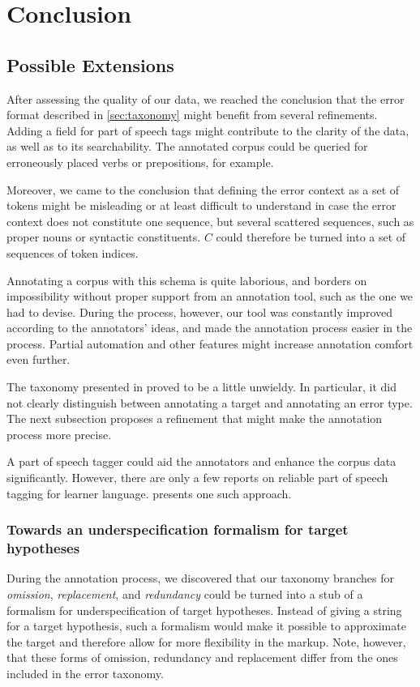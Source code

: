 \documentclass[12pt]{article}
\begin{document}
\section{Conclusion}

\subsection{Possible Extensions}

After assessing the quality of our data, we reached
the conclusion that the error format described in \ref{sec:taxonomy}
might benefit from several refinements. Adding a field for part of speech tags
might contribute to the clarity of the data, as well as to its searchability.
The annotated corpus could be queried for erroneously placed verbs or
prepositions, for example.

Moreover, we came to the conclusion that defining the error context as a set of
tokens might be misleading or at least difficult to understand in case the error
context does not constitute one sequence, but several scattered sequences, such
as proper nouns or syntactic constituents. $C$ could therefore be turned into a
set of sequences of token indices.

Annotating a corpus with this schema is quite laborious, and borders on
impossibility without proper support from an annotation tool, such as the one we
had to devise. During the process, however, our tool was constantly improved
according to the annotators' ideas, and made the annotation process easier in
the process. Partial automation and other features might increase annotation
comfort even further.

The taxonomy presented in \label{taxonomy} proved to be a little unwieldy. In
particular, it did not clearly distinguish between annotating a target and
annotating an error type. The next subsection proposes a refinement that might
make the annotation process more precise.

A part of speech tagger could aid the annotators and enhance the corpus data
significantly. However, there are only a few reports on reliable part of speech
tagging for learner language. \cite{ludeling} presents one such approach.

\subsubsection{Towards an underspecification formalism for target hypotheses}

During the annotation process, we discovered that our taxonomy branches for
\textit{omission}, \textit{replacement}, and \textit{redundancy} could be turned
into a stub of a formalism for underspecification of target hypotheses. Instead
of giving a string for a target hypothesis, such a formalism would make it
possible to approximate the target and therefore allow for more flexibility in
the markup. Note, however, that these forms of omission, redundancy and
replacement differ from the ones included in the error taxonomy.
\end{document}

